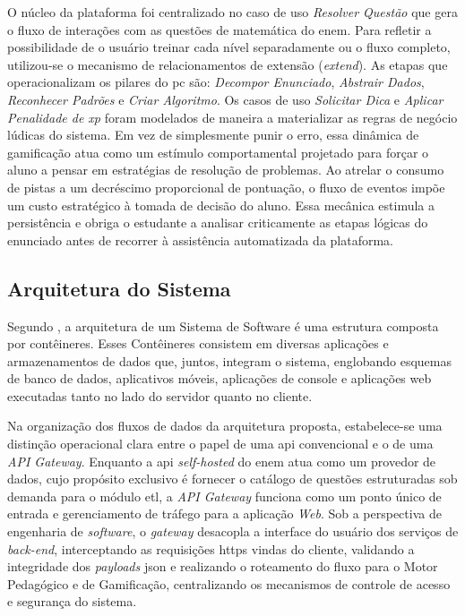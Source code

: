 O núcleo da plataforma foi centralizado no caso de uso \textit{Resolver Questão}
que gera o fluxo de interações com as questões de matemática do \gls{enem}. Para
refletir a possibilidade de o usuário treinar cada nível separadamente ou o fluxo
completo, utilizou-se o mecanismo de relacionamentos de extensão
(\textit{extend}). As etapas que operacionalizam os pilares do \gls{pc} são:
\textit{Decompor Enunciado}, \textit{Abstrair Dados}, \textit{Reconhecer
Padrões} e \textit{Criar Algoritmo}. Os casos de uso \textit{Solicitar Dica} e
\textit{Aplicar Penalidade de \gls{xp}} foram modelados de maneira a materializar as
regras de negócio lúdicas do sistema. Em vez de simplesmente punir o erro, essa
dinâmica de gamificação atua como um estímulo comportamental projetado para
forçar o aluno a pensar em estratégias de resolução de problemas. Ao atrelar o consumo de
pistas a um decréscimo proporcional de pontuação, o fluxo de eventos impõe um
custo estratégico à tomada de decisão do aluno. Essa mecânica estimula a
persistência e obriga o estudante a analisar criticamente as etapas lógicas do
enunciado antes de recorrer à assistência automatizada da plataforma.





\subsection{Arquitetura do Sistema}
\label{sec:arquitetura}
Segundo , a arquitetura de um Sistema de Software é
uma estrutura composta por contêineres. Esses Contêineres consistem em diversas
aplicações e armazenamentos de dados que, juntos, integram o sistema, englobando
esquemas de banco de dados, aplicativos móveis, aplicações de console e
aplicações web executadas tanto no lado do servidor quanto no cliente. 

Na organização dos fluxos de dados da arquitetura proposta, estabelece-se uma
distinção operacional clara entre o papel de uma \gls{api} convencional e o de uma
\textit{API Gateway}. Enquanto a \gls{api} \textit{self-hosted} do \gls{enem} atua como um
provedor de dados, cujo propósito exclusivo é fornecer o catálogo de questões
estruturadas sob demanda para o módulo \gls{etl}, a \textit{API Gateway} funciona como
um ponto único de entrada e gerenciamento de tráfego para a aplicação
\textit{Web}. Sob a perspectiva de engenharia de \textit{software}, o
\textit{gateway} desacopla a interface do usuário dos serviços de
\textit{back-end}, interceptando as requisições \gls{https} vindas do cliente,
validando a integridade dos \textit{payloads} \gls{json} e realizando o roteamento do
fluxo para o Motor Pedagógico e de Gamificação, centralizando os mecanismos de
controle de acesso e segurança do sistema.


